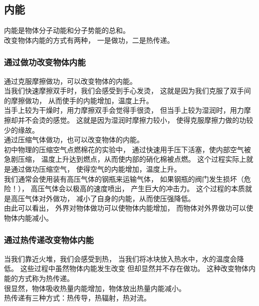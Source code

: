 \documentclass[UTF8]{ctexart}
\begin{document}
\newpage

\subsection{内能}
    内能是物体分子动能和分子势能的总和。\\[3mm]
    改变物体内能的方式有两种，
    一是做功，二是热传递。\vspace{3pt}

\subsubsection{通过做功改变物体内能}
    通过克服摩擦做功，可以改变物体的内能。\\[3mm]
    当我们快速摩擦双手时，我们会感受到手心发烫，
    这就是因为我们克服了双手间的摩擦做功，
    从而使手的内能增加，温度上升。\\[3mm]
    当手上较为干燥时，用力摩擦双手会觉得手很烫，
    但当手上较为湿润时，用力摩擦却并不会烫的感觉。
    这就是因为湿润时摩擦力较小，
    使得克服摩擦力做的功较少的缘故。\\[3mm]
    通过压缩气体做功，也可以改变物体的内能。\\[3mm]
    初中物理的压缩空气点燃棉花的实验中，
    通过快速用手压下活塞，使内部空气被急剧压缩，
    温度上升达到燃点，从而使内部的硝化棉被点燃。
    这个过程实际上就是通过做功压缩空气，
    使得空气的内能增加，温度上升。\\[3mm]
    我们通常会使用装有高压气体的钢瓶来运输气体，
    如果钢瓶的阀门发生损坏（危险！），
    高压气体会以极高的速度喷出，
    产生巨大的冲击力。
    这个过程的本质就是高压气体对外做功，
    减小了自身的内能，从而使压强降低。\\[3mm]
    由此可以看出，
    外界对物体做功可以使物体内能增加，
    而物体对外界做功可以使物体内能减小。\\

\subsubsection{通过热传递改变物体内能}
    当我们靠近火堆，我们会感受到热，
    当我们将冰块放入热水中，水的温度会降低。
    这些过程中虽然物体内能发生改变
    但却显然并不存在做功。
    这种改变物体内能的方式称为热传递。\\[3mm]
    很显然，物体吸收热量内能增加，物体放出热量内能减小。\\[3mm]
    热传递有三种方式：热传导，热辐射，热对流。

\newpage
\end{document}
